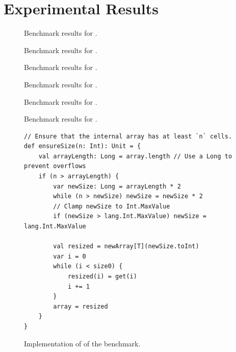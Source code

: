\section{Experimental Results}

\begin{figure}
	\centering
	
	\caption{Benchmark results for .}
	\label{results:array-append}
\end{figure}

\begin{figure}
	\centering
	
	\caption{Benchmark results for .}
	\label{results:array-contains}
\end{figure}

\begin{figure}
	\centering
	
	\caption{Benchmark results for .}
	\label{results:array-reverse}
\end{figure}

\begin{figure}
	\centering
	
	\caption{Benchmark results for .}
	\label{results:list-append}
\end{figure}

\begin{figure}
	\centering
	
	\caption{Benchmark results for .}
	\label{results:list-contains}
\end{figure}

\begin{figure}
	\centering
	
	\caption{Benchmark results for .}
	\label{results:list-hashcode}
\end{figure}

\begin{figure}[!htb]
\begin{verbatim}
// Ensure that the internal array has at least `n` cells. 
def ensureSize(n: Int): Unit = {
	val arrayLength: Long = array.length // Use a Long to prevent overflows
	if (n > arrayLength) {
		var newSize: Long = arrayLength * 2
		while (n > newSize) newSize = newSize * 2
		// Clamp newSize to Int.MaxValue
		if (newSize > lang.Int.MaxValue) newSize = lang.Int.MaxValue
		
		val resized = newArray[T](newSize.toInt)
		var i = 0
		while (i < size0) {
			resized(i) = get(i)
			i += 1
		}
		array = resized
	}
}	
\end{verbatim}
\caption{Implementation of  of the  benchmark.}
\label{example:arraybuffer-resize}
\end{figure}

